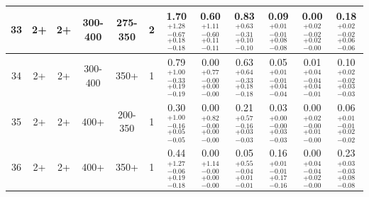 \begin{landscape}
\begin{table}[hp]
\begin{lrbox}{\resBox}
\begin{tabular}{|c|c|c|c|c||c|c||c|c|c|c|c|}
 \hline
             33 &              2+ &              2+ &         300-400 &         275-350  &      2 &   1.70 $^{+1.28}_{-0.67}$ $^{+0.18}_{-0.18}$ &   0.60 $^{+1.11}_{-0.60}$ $^{+0.11}_{-0.11}$ &   0.83 $^{+0.63}_{-0.31}$ $^{+0.10}_{-0.10}$ &   0.09 $^{+0.01}_{-0.01}$ $^{+0.08}_{-0.08}$ &   0.00 $^{+0.02}_{-0.02}$ $^{+0.02}_{-0.00}$ &   0.18 $^{+0.02}_{-0.02}$ $^{+0.06}_{-0.06}$ \\
 \hline
             34 &              2+ &              2+ &         300-400 &            350+  &      1 &   0.79 $^{+1.00}_{-0.33}$ $^{+0.19}_{-0.19}$ &   0.00 $^{+0.77}_{-0.00}$ $^{+0.00}_{-0.00}$ &   0.63 $^{+0.64}_{-0.33}$ $^{+0.18}_{-0.18}$ &   0.05 $^{+0.01}_{-0.01}$ $^{+0.04}_{-0.04}$ &   0.01 $^{+0.04}_{-0.04}$ $^{+0.04}_{-0.01}$ &   0.10 $^{+0.02}_{-0.02}$ $^{+0.03}_{-0.03}$ \\
 \hline
             35 &              2+ &              2+ &            400+ &         200-350  &      1 &   0.30 $^{+1.00}_{-0.16}$ $^{+0.05}_{-0.05}$ &   0.00 $^{+0.82}_{-0.00}$ $^{+0.00}_{-0.00}$ &   0.21 $^{+0.57}_{-0.16}$ $^{+0.03}_{-0.03}$ &   0.03 $^{+0.00}_{-0.00}$ $^{+0.03}_{-0.03}$ &   0.00 $^{+0.02}_{-0.00}$ $^{+0.01}_{-0.00}$ &   0.06 $^{+0.01}_{-0.01}$ $^{+0.02}_{-0.02}$ \\
 \hline
             36 &              2+ &              2+ &            400+ &            350+  &      1 &   0.44 $^{+1.27}_{-0.06}$ $^{+0.19}_{-0.18}$ &   0.00 $^{+1.14}_{-0.00}$ $^{+0.00}_{-0.00}$ &   0.05 $^{+0.55}_{-0.04}$ $^{+0.01}_{-0.01}$ &   0.16 $^{+0.01}_{-0.01}$ $^{+0.17}_{-0.16}$ &   0.00 $^{+0.04}_{-0.04}$ $^{+0.02}_{-0.00}$ &   0.23 $^{+0.03}_{-0.03}$ $^{+0.08}_{-0.08}$ \\
 \hline
\end{tabular}
\end{lrbox}
\scalebox{0.80}{\usebox{\resBox}}
\end{table}
\end{landscape}

